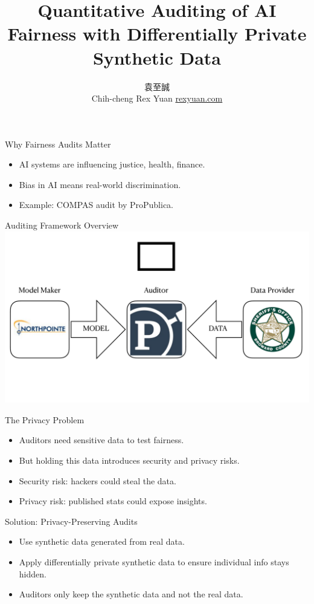 \documentclass{beamer}
\date{\displaydate{date}}
\title[Fairness]{Quantitative Auditing of AI Fairness with Differentially Private Synthetic Data}
\author[Rex]{
    \begin{CJK}{UTF8}{bsmi}袁至誠\end{CJK}\newline
    Chih-cheng Rex Yuan\newline
    \href{https://rexyuan.com/}{rexyuan.com}
    }
\institute[IIS,AS]{Institute of Information Science, Academia Sinica}
\begin{document}
\begin{frame}
\titlepage
\end{frame}

\begin{frame}{Why Fairness Audits Matter}
  \begin{itemize}
    \item AI systems are influencing justice, health, finance.
    \item Bias in AI means real-world discrimination.
    \item Example: COMPAS audit by ProPublica.
  \end{itemize}
\end{frame}

\begin{frame}{Auditing Framework Overview}
    \includegraphics[width=\linewidth]{compas}
\end{frame}

\begin{frame}{The Privacy Problem}
  \begin{itemize}
    \item Auditors need sensitive data to test fairness.
    \item But holding this data introduces security and privacy risks.
    \item Security risk: hackers could steal the data.
    \item Privacy risk: published stats could expose insights.
  \end{itemize}
\end{frame}

\begin{frame}{Solution: Privacy-Preserving Audits}
  \begin{itemize}
    \item Use synthetic data generated from real data.
    \item Apply differentially private synthetic data to ensure individual info stays hidden.
    \item Auditors only keep the synthetic data and not the real data.
  \end{itemize}
\end{frame}
\end{document}
